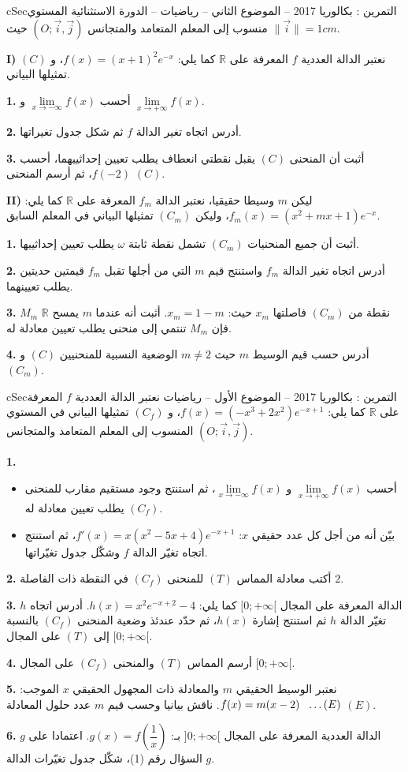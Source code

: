 \documentclass[12pt,a4paper]{article}
\newenvironment{BOX}[2]{\begin{otherlanguage}{english}\begin{arbox}{#1}{#2}}{\end{arbox}\end{otherlanguage}}
\newcounter{exo}
\newenvironment{tamrin}[1]{\stepcounter{exo}\begin{BOX}{cSec}{التمرين \theexo: #1}}{\end{BOX}}
\renewcommand{\ldots}{\mathinner{\ldotp\ldotp\ldotp}}
\newcommand{\R}{\mathbb{R}}
\newenvironment{sq}{\begin{itemize}[leftmargin=2.4em,itemsep=3pt]}{\end{itemize}}
\newcommand{\qa}{\item[(أ)]}\newcommand{\qb}{\item[(ب)]}\newcommand{\qc}{\item[(جـ)]}\newcommand{\qd}{\item[(د)]}\newcommand{\qe}{\item[(هـ)]}
\newcommand{\QQ}[1]{\par\smallskip\textbf{#1.} }
\begin{document}
\begin{tamrin}{بكالوريا 2017 -- الموضوع الثاني -- رياضيات -- الدورة الاستثنائية}
المستوي منسوب إلى المعلم المتعامد والمتجانس $(O;\vec i,\vec j)$ حيث $\|\vec i\|=1cm$.

\textbf{I)} نعتبر الدالة العددية $f$ المعرفة على $\R$ كما يلي: $f(x)=(x+1)^2e^{-x}$، و $(C)$ تمثيلها البياني.
\QQ{1} أحسب $\lim\limits_{x\to-\infty}f(x)$ و $\lim\limits_{x\to+\infty}f(x)$.
\QQ{2} أدرس اتجاه تغير الدالة $f$ ثم شكل جدول تغيراتها.
\QQ{3} أثبت أن المنحنى $(C)$ يقبل نقطتي انعطاف يطلب تعيين إحداثييهما، أحسب $f(-2)$، ثم أرسم المنحنى $(C)$.

\textbf{II)} ليكن $m$ وسيطا حقيقيا، نعتبر الدالة $f_m$ المعرفة على $\R$ كما يلي: $f_m(x)=\left(x^2+mx+1\right)e^{-x}$، وليكن $(C_m)$ تمثيلها البياني في المعلم السابق.
\QQ{1} أثبت أن جميع المنحنيات $(C_m)$ تشمل نقطة ثابتة $\omega$ يطلب تعيين إحداثييها.
\QQ{2} أدرس اتجاه تغير الدالة $f_m$ واستنتج قيم $m$ التي من أجلها تقبل $f_m$ قيمتين حديتين يطلب تعيينهما.
\QQ{3} $M_m$ نقطة من $(C_m)$ فاصلتها $x_m$ حيث: $x_m=1-m$.
أثبت أنه عندما $m$ يمسح $\R$ فإن $M_m$ تنتمي إلى منحنى يطلب تعيين معادلة له.
\QQ{4} أدرس حسب قيم الوسيط $m$ حيث $m\neq2$ الوضعية النسبية للمنحنيين $(C)$ و $(C_m)$.
\end{tamrin}

\begin{tamrin}{بكالوريا 2017 -- الموضوع الأول -- رياضيات}
نعتبر الدالة العددية $f$ المعرفة على $\R$ كما يلي: $f(x)=(-x^3+2x^2)e^{-x+1}$،
و $(C_f)$ تمثيلها البياني في المستوي المنسوب إلى المعلم المتعامد والمتجانس $(O;\vec i,\vec j)$.
\QQ{1}
\begin{sq}
\qa أحسب $\lim\limits_{x\to+\infty}f(x)$ و $\lim\limits_{x\to-\infty}f(x)$، ثم استنتج وجود مستقيم مقارب للمنحنى $(C_f)$ يطلب تعيين معادلة له.
\qb بيّن أنه من أجل كل عدد حقيقي $x$: $f'(x)=x(x^2-5x+4)e^{-x+1}$، ثم استنتج اتجاه تغيّر الدالة $f$ وشكّل جدول تغيّراتها.
\end{sq}
\QQ{2} أكتب معادلة المماس $(T)$ للمنحنى $(C_f)$ في النقطة ذات الفاصلة $2$.
\QQ{3} $h$ الدالة المعرفة على المجال $[0;+\infty[$ كما يلي: $h(x)=x^2e^{-x+2}-4$.
أدرس اتجاه تغيّر الدالة $h$ ثم استنتج إشارة $h(x)$، ثم حدّد عندئذ وضعية المنحنى $(C_f)$ بالنسبة إلى $(T)$ على المجال $[0;+\infty[$.
\QQ{4} أرسم المماس $(T)$ والمنحنى $(C_f)$ على المجال $[0;+\infty[$.
\QQ{5} نعتبر الوسيط الحقيقي $m$ والمعادلة ذات المجهول الحقيقي $x$ الموجب: \quad $f(x)=m(x-2)\ \ \ldots(E)$.
ناقش بيانيا وحسب قيم $m$ عدد حلول المعادلة $(E)$.
\QQ{6} $g$ الدالة العددية المعرفة على المجال $]0;+\infty[$ بـ: $g(x)=f\left(\dfrac1x\right)$.
اعتمادا على السؤال رقم (1)، شكّل جدول تغيّرات الدالة $g$.
\end{tamrin}
\end{document}
